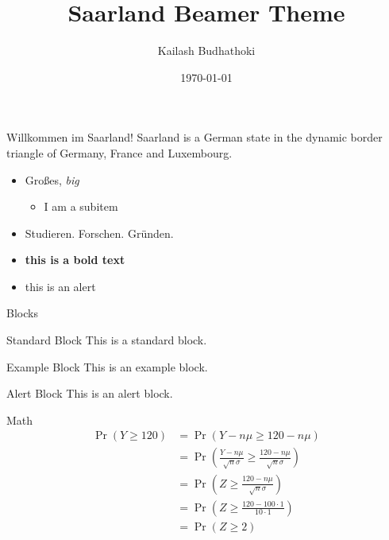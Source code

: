 \documentclass[aspectratio=169]{beamer}
\author{Kailash Budhathoki}
\title{Saarland Beamer Theme}
\institute{Max Planck Institute for Informatics and Saarland University}
\date{\today}
\begin{document}
	\begin{frame}
		\titlepage
	\end{frame}
	
	\begin{frame}{Willkommen im Saarland!}
	Saarland is a German state in the dynamic border triangle of Germany, France and Luxembourg. 
		\begin{itemize}
			\item Gro{\ss}es, \textit{big}
				\begin{itemize}
					\item I am a subitem
				\end{itemize}
			\item Studieren. Forschen. Gr{\"u}nden.	
			\item \textbf{this is a bold text}
			\item \alert{this is an alert}
		\end{itemize}
	\end{frame}

	\begin{frame}{Blocks}
		\begin{block}{Standard Block}
			This is a standard block.
		\end{block}
		
		\begin{exampleblock}{Example Block}
			This is an example block.
		\end{exampleblock}
		
		\begin{alertblock}{Alert Block}
			This is an alert block.
		\end{alertblock}
	\end{frame}
	
	\begin{frame}{Math}
		\begin{align*}
			\Pr(Y \geq 120) &= \Pr\left(Y-n\mu \geq 120-n\mu \right)\\
			&= \Pr\left( \frac{Y-n\mu }{\sqrt{n}\sigma} \geq \frac{120-n\mu }{\sqrt{n}\sigma} \right)\\
			&=\Pr\left( Z \geq \frac{120-n\mu }{\sqrt{n}\sigma} \right)\\
			&=\Pr\left( Z \geq \frac{120-100 \cdot 1 }{10 \cdot 1} \right)\\
			&=\Pr\left( Z \geq 2\right)
		\end{align*}
	\end{frame}
\end{document}
